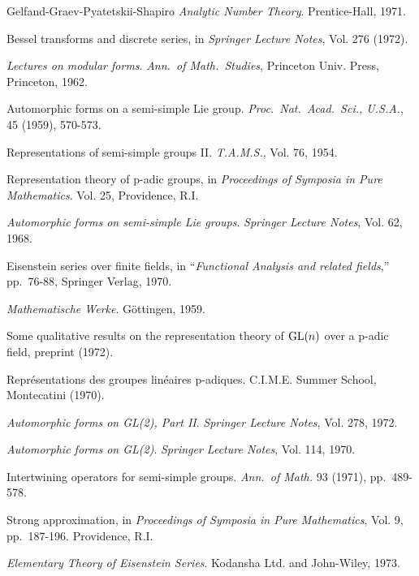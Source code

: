 \begin{thebibliography}{Gelfand-Graev-Pyatetskii-Shapiro}
 \emph{Analytic Number Theory}. Prentice-Hall, 1971.

 Bessel transforms and discrete series, in \emph{Springer Lecture Notes}, Vol. 276 (1972).

 \emph{Lectures on modular forms}. \emph{Ann.\ of Math.\ Studies}, Princeton Univ. Press, Princeton, 1962.

 Automorphic forms on a semi-simple Lie group. \emph{Proc.\ Nat.\ Acad.\ Sci., U.S.A.}, 45 (1959), 570-573.

 Representations of semi-simple groups II. \emph{T.A.M.S.}, Vol. 76, 1954.

 Representation theory of p-adic groups, in \emph{Proceedings of Symposia in Pure Mathematics}. Vol. 25, Providence, R.I.

 \emph{Automorphic forms on semi-simple Lie groups}. \emph{Springer Lecture Notes}, Vol. 62, 1968.

 Eisenstein series over finite fields, in ``\emph{Functional Analysis and related fields},'' pp.\ 76-88, Springer Verlag, 1970.

 \emph{Mathematische Werke}. G\"ottingen, 1959.

 Some qualitative results on the representation theory of $\operatorname{GL}(n)$ over a p-adic field, preprint (1972).

 Repr\'esentations des groupes lin\'eaires p-adiques. C.I.M.E. Summer School, Montecatini (1970).

 \emph{Automorphic forms on GL(2), Part II}. \emph{Springer Lecture Notes}, Vol. 278, 1972.

 \emph{Automorphic forms on GL(2)}. \emph{Springer Lecture Notes}, Vol. 114, 1970.

 Intertwining operators for semi-simple groups. \emph{Ann.\ of Math.} 93 (1971), pp.\ 489-578.

 Strong approximation, in \emph{Proceedings of Symposia in Pure Mathematics}, Vol. 9, pp.\ 187-196. Providence, R.I.

 \emph{Elementary Theory of Eisenstein Series}. Kodansha Ltd. and John-Wiley, 1973.


\end{thebibliography}
